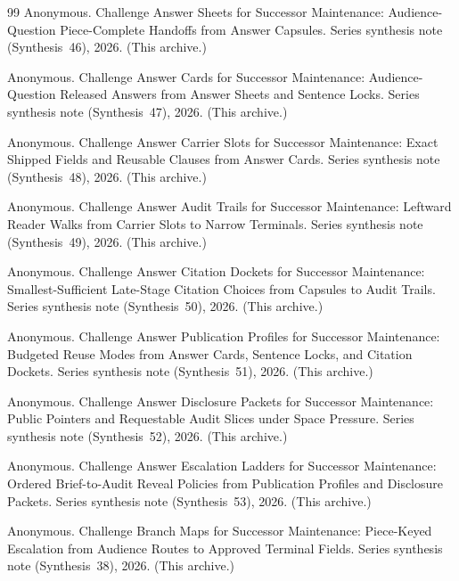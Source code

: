 \documentclass[11pt]{article}
\begin{document}
\begin{thebibliography}{99}
Anonymous.
\newblock Challenge Answer Sheets for Successor Maintenance: Audience-Question Piece-Complete Handoffs from Answer Capsules.
\newblock Series synthesis note (Synthesis~46), 2026. (This archive.)

Anonymous.
\newblock Challenge Answer Cards for Successor Maintenance: Audience-Question Released Answers from Answer Sheets and Sentence Locks.
\newblock Series synthesis note (Synthesis~47), 2026. (This archive.)

Anonymous.
\newblock Challenge Answer Carrier Slots for Successor Maintenance: Exact Shipped Fields and Reusable Clauses from Answer Cards.
\newblock Series synthesis note (Synthesis~48), 2026. (This archive.)

Anonymous.
\newblock Challenge Answer Audit Trails for Successor Maintenance: Leftward Reader Walks from Carrier Slots to Narrow Terminals.
\newblock Series synthesis note (Synthesis~49), 2026. (This archive.)

Anonymous.
\newblock Challenge Answer Citation Dockets for Successor Maintenance: Smallest-Sufficient Late-Stage Citation Choices from Capsules to Audit Trails.
\newblock Series synthesis note (Synthesis~50), 2026. (This archive.)

Anonymous.
\newblock Challenge Answer Publication Profiles for Successor Maintenance: Budgeted Reuse Modes from Answer Cards, Sentence Locks, and Citation Dockets.
\newblock Series synthesis note (Synthesis~51), 2026. (This archive.)

Anonymous.
\newblock Challenge Answer Disclosure Packets for Successor Maintenance: Public Pointers and Requestable Audit Slices under Space Pressure.
\newblock Series synthesis note (Synthesis~52), 2026. (This archive.)

Anonymous.
\newblock Challenge Answer Escalation Ladders for Successor Maintenance: Ordered Brief-to-Audit Reveal Policies from Publication Profiles and Disclosure Packets.
\newblock Series synthesis note (Synthesis~53), 2026. (This archive.)

Anonymous.
\newblock Challenge Branch Maps for Successor Maintenance: Piece-Keyed Escalation from Audience Routes to Approved Terminal Fields.
\newblock Series synthesis note (Synthesis~38), 2026. (This archive.)


\end{thebibliography}
\end{document}
